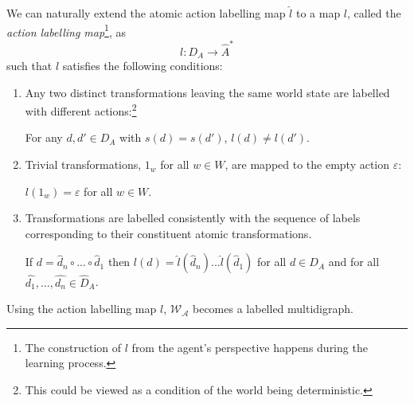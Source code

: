 We can naturally extend the atomic action labelling map $\hat{l}$ to a map $l$, called the \emph{action labelling map}\footnote{
    The construction of $l$ from the agent's perspective happens during the learning process.
}, as
\begin{equation}
    l: D_{A} \to \hat{A}^{*}
\end{equation}
such that $l$ satisfies the following conditions:
\begin{enumerate}
    \item Any two distinct transformations leaving the same world state are labelled with different actions:\footnote{
    This could be viewed as a condition of the world being deterministic.
    }
    \begin{actioncondition}[Uniqueness]\label{actcon:action_gives_single_outcome}
      For any $d,d' \in D_{A}$ with $s(d)=s(d')$, $l(d) \neq l(d')$.
    \end{actioncondition}

    \item Trivial transformations, $1_{w}$ for all $w \in W$, are mapped to the empty action $\varepsilon$:
    \begin{actioncondition}[Identity]\label{actcon:trivial_transformations_mapped_to_empty_sequence}
      $l(1_{w}) = \varepsilon$ for all $w \in W$.
    \end{actioncondition}

    \item Transformations are labelled consistently with the sequence of labels corresponding to their constituent atomic transformations.
    \begin{actioncondition}\label{actcon:composition_consistency}
      If $d = \hat{d}_{n} \circ ... \circ \hat{d}_{1}$ then $l(d) = \hat{l}(\hat{d}_{n}) ... \hat{l}(\hat{d}_{1})$ for all $d \in D_{A}$ and for all $\hat{d_{1}}, \dots , \hat{d_{n}} \in \hat{D}_{A}$.
    \end{actioncondition}
\end{enumerate}
Using the action labelling map $l$, $\mathscr{W}_{\mathscr{A}}$ becomes a labelled multidigraph.

